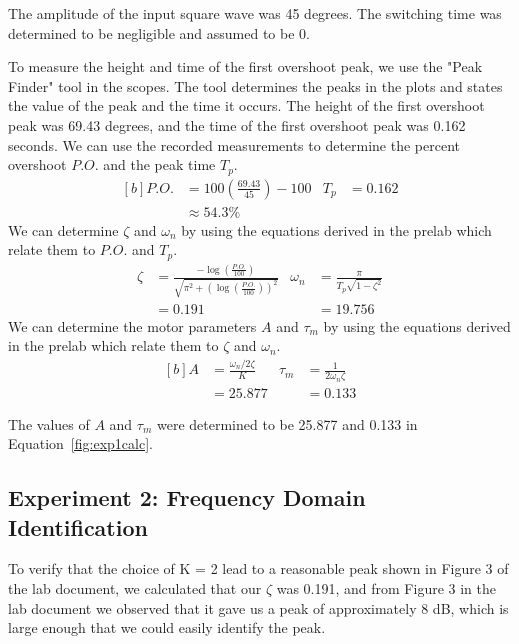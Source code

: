 \documentclass[12pt]{article}
\begin{document}
The amplitude of the input square wave was 45 degrees. The switching time was determined to be negligible and assumed to be 0.

To measure the height and time of the first overshoot peak, we use the "Peak Finder" tool in the scopes. The tool determines the peaks in the plots and states the value of the peak and the time it occurs. The height of the first overshoot peak was 69.43 degrees, and the time of the first overshoot peak was 0.162 seconds.
We can use the recorded measurements to determine the percent overshoot $P.O.$ and the peak time $T_p$.
\begin{equation*}
\begin{aligned}[b]
    P.O. &= 100\left(\frac{69.43}{45}\right) - 100 & T_p &= 0.162 \\
    &\approx 54.3\%
\end{aligned}
\end{equation*}
We can determine $\zeta$ and $\omega_n$ by using the equations derived in the prelab which relate them to $P.O.$ and $T_p$.
\begin{equation*}
\begin{aligned}
    \zeta &= \frac{-\log\left(\frac{P.O.}{100}\right)}{\sqrt{\pi^2 + \left(\log\left(\frac{P.O.}{100}\right)\right)^2}} & \omega_n &= \frac{\pi}{T_p\sqrt{1-\zeta^2}} \\
    &= 0.191 & &= 19.756
\end{aligned}
\end{equation*}
We can determine the motor parameters $A$ and $\tau_m$ by using the equations derived in the prelab which relate them to $\zeta$ and $\omega_n$.
\begin{equation} \label{fig:exp1calc}
\begin{aligned}[b]
    A &= \frac{\omega_n / 2\zeta}{K} & \tau_m &= \frac{1}{2\omega_n\zeta} \\
    &= 25.877 & &= 0.133
\end{aligned}
\end{equation}

The values of $A$ and $\tau_m$ were determined to be 25.877 and 0.133 in Equation~\ref{fig:exp1calc}.

\subsection{Experiment 2: Frequency Domain Identification}
To verify that the choice of K = 2 lead to a reasonable peak shown in Figure 3 of the lab document, we calculated that our $\zeta$ was 0.191, and from Figure 3 in the lab document we observed that it gave us a peak of approximately 8 dB, which is large enough that we could easily identify the peak.
\end{document}
